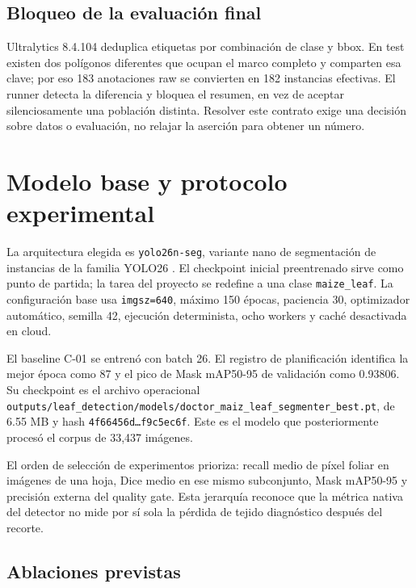 \documentclass[11pt,a4paper]{article}
\begin{document}
\subsection{Bloqueo de la evaluación final}

Ultralytics 8.4.104 deduplica etiquetas por combinación de clase y bbox. En test existen dos polígonos diferentes que ocupan el marco completo y comparten esa clave; por eso 183 anotaciones raw se convierten en 182 instancias efectivas. El runner detecta la diferencia y bloquea el resumen, en vez de aceptar silenciosamente una población distinta. Resolver este contrato exige una decisión sobre datos o evaluación, no relajar la aserción para obtener un número.


\section{Modelo base y protocolo experimental}

La arquitectura elegida es \texttt{yolo26n-seg}, variante nano de segmentación de instancias de la familia YOLO26 \citep{jocher2026yolo26}. El checkpoint inicial preentrenado sirve como punto de partida; la tarea del proyecto se redefine a una clase \texttt{maize\_leaf}. La configuración base usa \texttt{imgsz=640}, máximo 150 épocas, paciencia 30, optimizador automático, semilla 42, ejecución determinista, ocho workers y caché desactivada en cloud.


El baseline C-01 se entrenó con batch 26. El registro de planificación identifica la mejor época como 87 y el pico de Mask mAP50-95 de validación como 0.93806. Su checkpoint es el archivo operacional \texttt{outputs/leaf\_detection/models/doctor\_maiz\_leaf\_segmenter\_best.pt}, de 6.55 MB y hash \texttt{4f66456d…f9c5ec6f}. Este es el modelo que posteriormente procesó el corpus de 33,437 imágenes.


El orden de selección de experimentos prioriza: recall medio de píxel foliar en imágenes de una hoja, Dice medio en ese mismo subconjunto, Mask mAP50-95 y precisión externa del quality gate. Esta jerarquía reconoce que la métrica nativa del detector no mide por sí sola la pérdida de tejido diagnóstico después del recorte.


\subsection{Ablaciones previstas}
\end{document}

